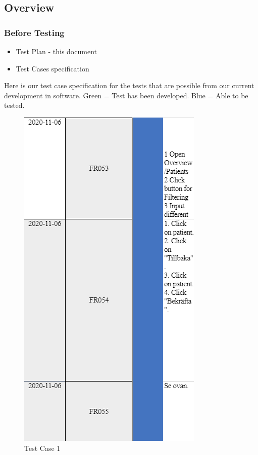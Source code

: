 \subsection{Overview}
\subsubsection{Before Testing}
\begin{itemize}
    \item Test Plan - this document
    \item{Test Cases specification}
\end{itemize}
Here is our test case specification for the tests that are possible from our current development in software. Green = Test has been developed. Blue = Able to be tested.
\begin{figure}[ht!]
\begin{minipage}[t]{0.5\textwidth}
    \centering
    \includegraphics[scale=0.75]{Pictures/TestCase1.PNG}
    \caption{Test Case 1}
\end{minipage}%

\end{figure}
